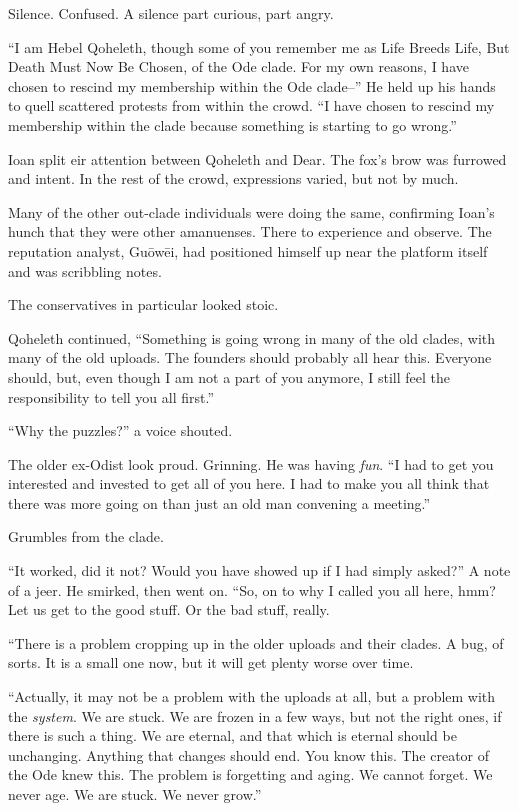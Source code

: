 Silence. Confused. A silence part curious, part angry.

``I am Hebel Qoheleth, though some of you remember me as Life Breeds Life, But Death Must Now Be Chosen, of the Ode clade. For my own reasons, I have chosen to rescind my membership within the Ode clade--'' He held up his hands to quell scattered protests from within the crowd. ``I have chosen to rescind my membership within the clade because something is starting to go wrong.''

Ioan split eir attention between Qoheleth and Dear. The fox's brow was furrowed and intent. In the rest of the crowd, expressions varied, but not by much.

Many of the other out-clade individuals were doing the same, confirming Ioan's hunch that they were other amanuenses. There to experience and observe. The reputation analyst, Guōwēi, had positioned himself up near the platform itself and was scribbling notes.

The conservatives in particular looked stoic.

Qoheleth continued, ``Something is going wrong in many of the old clades, with many of the old uploads. The founders should probably all hear this. Everyone should, but, even though I am not a part of you anymore, I still feel the responsibility to tell you all first.''

``Why the puzzles?'' a voice shouted.

The older ex-Odist look proud. Grinning. He was having \emph{fun}. ``I had to get you interested and invested to get all of you here. I had to make you all think that there was more going on than just an old man convening a meeting.''

Grumbles from the clade.

``It worked, did it not? Would you have showed up if I had simply asked?'' A note of a jeer. He smirked, then went on. ``So, on to why I called you all here, hmm? Let us get to the good stuff. Or the bad stuff, really.

``There is a problem cropping up in the older uploads and their clades. A bug, of sorts. It is a small one now, but it will get plenty worse over time.

``Actually, it may not be a problem with the uploads at all, but a problem with the \emph{system}. We are stuck. We are frozen in a few ways, but not the right ones, if there is such a thing. We are eternal, and that which is eternal should be unchanging. Anything that changes should end. You know this. The creator of the Ode knew this. The problem is forgetting and aging. We cannot forget. We never age. We are stuck. We never grow.''

